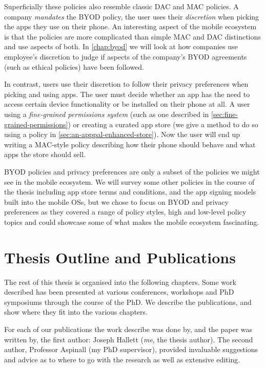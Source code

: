 \documentclass[thesis.tex]{subfiles}
\begin{document}
Superficially these policies also resemble classic \ac{DAC} and \ac{MAC}
policies. A company \emph{mandates} the \ac{BYOD} policy, the user uses
their \emph{discretion} when picking the apps they use on their phone.
An interesting aspect of the mobile ecosystem is that the policies are
more complicated than simple \ac{MAC} and \ac{DAC} distinctions and use aspects
of both.  In \autoref{chap:byod} we will look at how companies use
employee's discretion to judge if aspects of the company's \ac{BYOD}
agreements (such as ethical policies) have been followed.  

In contrast, users use their discretion to follow their privacy preferences when picking and using apps.
The user must decide whether an app has the need to access certain device functionality or be installed on their phone at all.
A user using a \emph{fine-grained permissions system} (such as
one described in \autoref{sec:fine-grained-permissions}) or creating a
curated app store (we give a method to do so using a policy in
\autoref{sec:an-apppal-enhanced-store}). Now the user will end up writing a
\ac{MAC}-style policy describing how their phone should behave and what apps
the store should sell.

\ac{BYOD} policies and privacy preferences are only a subset of the
policies we might see in the mobile ecosystem.  We will survey some
other policies in the course of the thesis including app store terms
and conditions, and the app signing models built into the mobile OSs,
but we chose to focus on \ac{BYOD} and privacy preferences as they covered
a range of policy styles, high and low-level policy topics and could
showcase some of what makes the mobile ecosystem fascinating.

\section{Thesis Outline and Publications}

The rest of this thesis is organised into the following chapters.  Some work
described has been presented at various conferences, workshops and PhD
symposiums through the course of the PhD.  We describe the publications, and
show where they fit into the various chapters.

For each of our publications the work describe was done by, and the paper was
written by, the first author: Joseph Hallett (\emph{me}, the thesis author).
The second author, Professor Aspinall (my PhD supervisor), provided invaluable suggestions
and advice as to where to go with the research as well as extensive editing.
\end{document}
